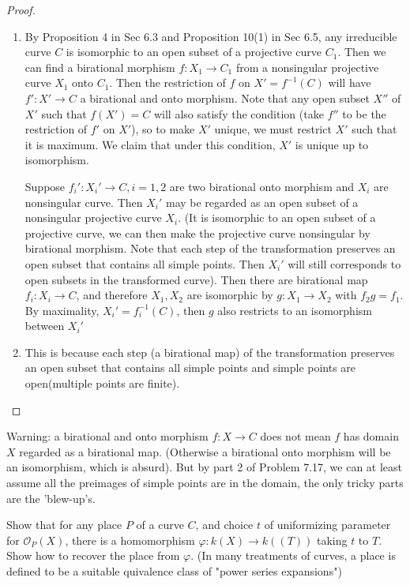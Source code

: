 \documentclass{solution}
\begin{document}
\begin{proof}
    \begin{enumerate}
        \item By Proposition 4 in Sec 6.3 and Proposition 10(1) in Sec 6.5, any irreducible curve $C$ is isomorphic to an open subset of a projective curve $C_1$. Then we can find a birational morphism $f: X_1 \rightarrow C_1$ from a nonsingular projective curve $X_1$ onto $C_1$. Then the restriction of $f$ on $X' = f ^{-1}(C)$ will have $f': X' \rightarrow C$ a birational and onto morphism. Note that any open subset $X''$ of $X'$ such that $f(X') = C$ will also satisfy the condition (take $f''$ to be the restriction of $f'$ on $X'$), so to make $X'$ unique, we must restrict $X'$ such that it is maximum. We claim that under this condition, $X'$ is unique up to isomorphism.
        
        Suppose $f_i': X_i' \rightarrow C, i = 1, 2$ are two birational onto morphism and $X_i$ are nonsingular curve. Then $X_i'$ may be regarded as an open subset of a nonsingular projective curve $X_i$. (It is isomorphic to an open subset of a projective curve, we can then make the projective curve nonsingular by birational morphism. Note that each step of the transformation preserves an open subset that contains all simple points. Then $X_i'$ will still corresponds to open subsets in the transformed curve). Then there are birational map $f_i: X_i \rightarrow C$, and therefore $X_1, X_2$ are isomorphic by $g: X_1 \rightarrow X_2$ with $f_2g = f_1$. By maximality, $X_i' = f_i ^{-1}(C)$, then $g$ also restricts to an isomorphism between $X_i'$
        \item This is because each step (a birational map) of the transformation preserves an open subset that contains all simple points and simple points are open(multiple points are finite).
    \end{enumerate}
\end{proof}

Warning: a birational and onto morphism $f: X \rightarrow C$ does not mean $f$ has domain $X$ regarded as a birational map. (Otherwise a birational onto morphism will be an isomorphism, which is absurd). But by part 2 of Problem 7.17, we can at least assume all the preimages of simple points are in the domain, the only tricky parts are the 'blew-up's.

\begin{problem}{7.18}
    Show that for any place $P$ of a curve $C$, and choice $t$ of uniformizing parameter for $\mathcal{O}_{P}(X)$, there is a homomorphism $\varphi: k(X) \rightarrow k((T))$ taking $t$ to $T$. Show how to recover the place from $\varphi$. (In many treatments of curves, a place is defined to be a suitable quivalence class of "power series expansions")
\end{problem}
\end{document}
